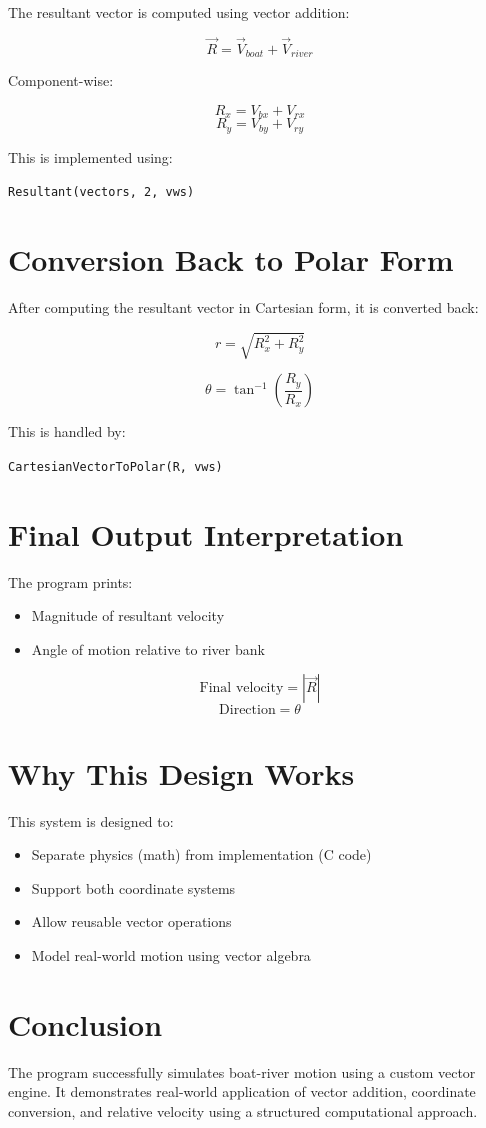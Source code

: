 \documentclass[12pt]{article}
\begin{document}
The resultant vector is computed using vector addition:

\[
\vec{R} = \vec{V}_{boat} + \vec{V}_{river}
\]

Component-wise:

\[
R_x = V_{bx} + V_{rx}
\]
\[
R_y = V_{by} + V_{ry}
\]

This is implemented using:

\texttt{Resultant(vectors, 2, vws)}

\section{Conversion Back to Polar Form}

After computing the resultant vector in Cartesian form, it is converted back:

\[
r = \sqrt{R_x^2 + R_y^2}
\]

\[
\theta = \tan^{-1}\left(\frac{R_y}{R_x}\right)
\]

This is handled by:

\texttt{CartesianVectorToPolar(R, vws)}

\section{Final Output Interpretation}

The program prints:

\begin{itemize}
    \item Magnitude of resultant velocity
    \item Angle of motion relative to river bank
\end{itemize}

\[
\text{Final velocity} = |\vec{R}|
\]
\[
\text{Direction} = \theta
\]

\section{Why This Design Works}

This system is designed to:
\begin{itemize}
    \item Separate physics (math) from implementation (C code)
    \item Support both coordinate systems
    \item Allow reusable vector operations
    \item Model real-world motion using vector algebra
\end{itemize}

\section{Conclusion}

The program successfully simulates boat-river motion using a custom vector engine. It demonstrates real-world application of vector addition, coordinate conversion, and relative velocity using a structured computational approach.
\end{document}
